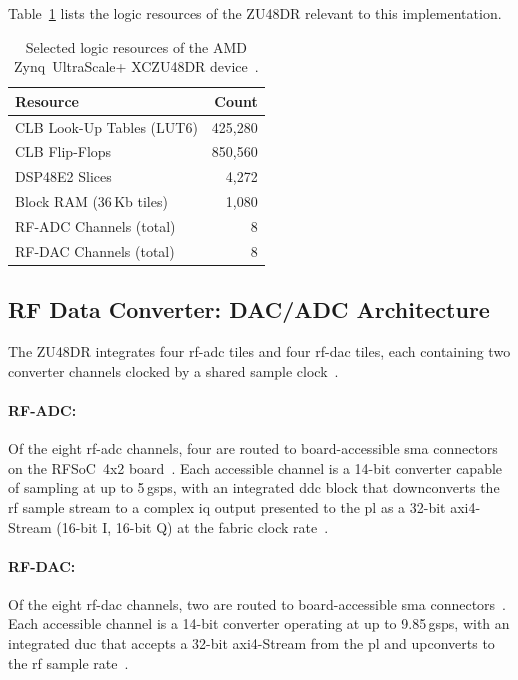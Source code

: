 Table~\ref{tab:zu48dr_resources} lists the logic resources of the
ZU48DR relevant to this implementation.

\begin{table}[htbp]
  \caption{Selected logic resources of the AMD Zynq~UltraScale+
           XCZU48DR device~\cite{AMD_DS889}.}
  \label{tab:zu48dr_resources}
  \centering
  \begin{tabular}{p{5.5cm}r}
    \hline
    Resource & Count \\
    \hline
    CLB Look-Up Tables (LUT6)    & 425{,}280 \\[3pt]
    CLB Flip-Flops               & 850{,}560 \\[3pt]
    DSP48E2 Slices               & 4{,}272   \\[3pt]
    Block RAM (36\,Kb tiles)     & 1{,}080   \\[3pt]
    RF-ADC Channels (total)      & 8         \\[3pt]
    RF-DAC Channels (total)      & 8         \\
    \hline
  \end{tabular}
\end{table}


\subsection{RF Data Converter: DAC/ADC Architecture}
\label{subsec:rfdc_background}

The ZU48DR integrates four \ac{rf}-\ac{adc} tiles and four
\ac{rf}-\ac{dac} tiles, each containing two converter channels
clocked by a shared sample clock~\cite{AMD_PG269}.

\paragraph{RF-ADC:}
Of the eight \ac{rf}-\ac{adc} channels, four are routed to
board-accessible \ac{sma} connectors on the RFSoC~4x2
board~\cite{Kovacs2024}.
Each accessible channel is a 14-bit converter capable of sampling
at up to 5\,\ac{gsps}, with an integrated \ac{ddc} block that
downconverts the \ac{rf} sample stream to a complex \ac{iq} output
presented to the \ac{pl} as a 32-bit \ac{axi}4-Stream (16-bit I,
16-bit Q) at the fabric clock rate~\cite{AMD_PG269}.

\paragraph{RF-DAC:}
Of the eight \ac{rf}-\ac{dac} channels, two are routed to
board-accessible \ac{sma} connectors~\cite{Kovacs2024}.
Each accessible channel is a 14-bit converter operating at up to
9.85\,\ac{gsps}, with an integrated \ac{duc} that accepts a
32-bit \ac{axi}4-Stream from the \ac{pl} and upconverts to the
\ac{rf} sample rate~\cite{AMD_PG269}.

